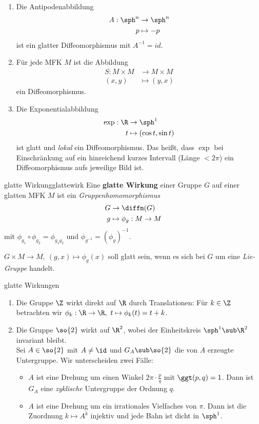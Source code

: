 \begin{beispiele}
\begin{enumerate}
\item Die Antipodenabbildung
\begin{align}
A: \sph^n &\to \sph^n \\
p &\mapsto -p
\end{align}
ist ein glatter Diffeomorphismus mit $A^{-1} = id$.
\item Für jede MFK $M$ ist die Abbildung
\begin{align}
S: M \times M &\to M \times M \\
(x, y) &\mapsto (y, x)
\end{align}
ein Diffeomorphismus.
\item Die Exponentialabbildung
\begin{align}
\exp: \R &\to \sph^1\\
t &\mapsto (\cos t, \sin t)
\end{align}
ist glatt und \textit{lokal} ein Diffeomorphismus. Das heißt, dass $\exp$ bei Einschränkung auf ein hinreichend kurzes Intervall (Länge $<2\pi$) ein Diffeomorphismus aufs jeweilige Bild ist.
\end{enumerate}
\end{beispiele}
\begin{definition}{glatte Wirkung}{glattewirk}
Eine \textbf{glatte Wirkung} einer Gruppe $G$ auf einer glatten MFK $M$ ist ein \textit{Gruppenhomomorphismus}
\begin{align}
G &\to \diffm (G)\\
g &\mapsto \phi_g: M \to M
\end{align}
mit $\phi_{g_1} \circ \phi_{g_2} = \phi_{g_1g_2}$ und $\phi_{g^{-1}}=(\phi_g)^{-1}$.
\end{definition}
$G \times M \to M, \ (g, x) \mapsto \phi_g(x)$ soll glatt sein, wenn es sich bei $G$ um eine \textit{Lie-Gruppe} handelt.
\begin{beispiele}glatte Wirkungen \\
\begin{enumerate}
\item Die Gruppe $\Z$ wirkt direkt auf $\R$ durch Translationen: Für $k \in \Z$ betrachten wir $\phi_k: \R \to \R, \ t \mapsto \phi_k(t)=t+k$.
\item Die Gruppe $\so{2}$ wirkt auf $\R^2$, wobei der Einheitskreis $\sph^1 \sub \R^2$ invariant bleibt.\\
Sei $A \in \so{2}$ mit $A \neq \id$ und $G_A \sub \so{2}$ die von $A$ erzeugte Untergruppe. Wir unterscheiden zwei Fälle:
\begin{itemize}
\item $A$ ist eine Drehung um einen Winkel $2 \pi \cdot \frac{p}{q}$ mit $\ggt (p,q) = 1$. Dann ist $G_A$ eine \textit{zyklische} Untergruppe der Ordnung $q$.
\item $A$ ist eine Drehung um ein irrationales Vielfaches von $\pi$. Dann ist die Zuordnung $k \mapsto A^k$ injektiv und jede Bahn ist dicht in $\sph^1$.
\end{itemize}
\end{enumerate}
\end{beispiele}
